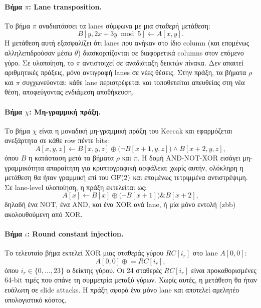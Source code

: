 \paragraph{Βήμα $\pi$: Lane transposition.}
Το βήμα $\pi$ αναδιατάσσει τα lanes σύμφωνα με μια σταθερή μετάθεση:
\begin{equation}
  B[y, 2x + 3y \bmod 5] \leftarrow A[x, y].
\end{equation}
Η μετάθεση αυτή εξασφαλίζει ότι lanes που ανήκαν στο ίδιο column (και
επομένως αλληλεπιδρούσαν μέσω $\theta$) διασκορπίζονται σε διαφορετικά
columns στον επόμενο γύρο.
Σε υλοποίηση, το $\pi$ αντιστοιχεί σε αναδιάταξη δεικτών πίνακα. Δεν
απαιτεί αριθμητικές πράξεις, μόνο αντιγραφή lanes σε νέες θέσεις.
Στην πράξη, τα βήματα $\rho$ και $\pi$ συγχωνεύονται: κάθε lane
περιστρέφεται και τοποθετείται απευθείας στη νέα θέση, αποφεύγοντας
ενδιάμεση αποθήκευση.

\paragraph{Βήμα $\chi$: Μη-γραμμική πράξη.}
Το βήμα $\chi$ είναι η μοναδική μη-γραμμική πράξη του Keccak και εφαρμόζεται
ανεξάρτητα σε κάθε row πέντε bits:
\begin{equation}
  A[x, y, z] \leftarrow B[x, y, z] \oplus \bigl(\lnot B[x+1, y, z] \bigr)
    \land B[x+2, y, z],
\end{equation}
όπου $B$ η κατάσταση μετά τα βήματα $\rho$ και $\pi$.
Η δομή AND-NOT-XOR εισάγει μη-γραμμικότητα απαραίτητη για κρυπτογραφική
ασφάλεια: χωρίς αυτήν, ολόκληρη η μετάθεση θα ήταν γραμμική επί του
$\mathrm{GF}(2)$ και επομένως τετριμμένα αντιστρέψιμη.
Σε lane-level υλοποίηση, η πράξη εκτελείται ως:
\begin{equation*}
  A[x] \leftarrow B[x] \oplus \bigl(\lnot B[x+1]\bigr) \mathbin{\&} B[x+2],
\end{equation*}
δηλαδή ένα NOT, ένα AND, και ένα XOR ανά lane, ή μία μόνο εντολή
 (\gls{zbb}) ακολουθούμενη από XOR.

\paragraph{Βήμα $\iota$: Round constant injection.}
Το τελευταίο βήμα εκτελεί XOR μιας σταθεράς γύρου $RC[i_r]$ στο lane
$A[0, 0]$:
\begin{equation}
  A[0, 0] \mathrel{\oplus}= RC[i_r],
\end{equation}
όπου $i_r \in \{0, \ldots, 23\}$ ο δείκτης γύρου.
Οι 24 σταθερές $RC[i_r]$ είναι προκαθορισμένες 64-bit τιμές που σπάνε τη
συμμετρία μεταξύ γύρων. Χωρίς αυτές, η μετάθεση θα ήταν ευάλωτη σε
slide attacks.
Η πράξη αφορά ένα μόνο lane και αποτελεί αμελητέο υπολογιστικό κόστος.


